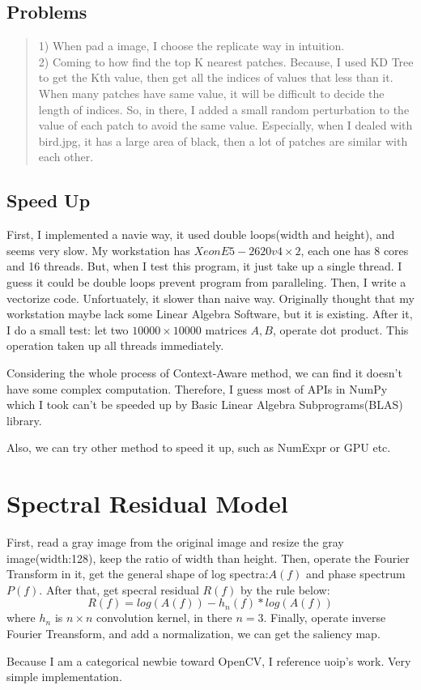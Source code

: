 \documentclass[10pt,twocolumn,letterpaper]{article}
\begin{document}
\subsection{Problems}
\begin{quote}
1) When pad a image, I choose the replicate way in intuition.\\
2) Coming to how find the top K nearest patches. Because, I used KD Tree to get the Kth value, then get all the indices of values that less than it. When many patches have same value, it will be difficult to decide the length of indices.
So, in there, I added a small random perturbation to the value of each patch to avoid the same value. Especially, when I dealed with bird.jpg, it has a large area of black, then a lot of patches are similar with each other.
\end{quote}
\subsection{Speed Up}
First, I implemented a navie way, it used double loops(width and height), and seems very slow. My workstation has $Xeon E5-2620 v4\times 2$, each one has 8 cores and 16 threads. But, when I test this program, it just take up a single thread. I guess it could be double loops prevent program from paralleling. Then, I write a vectorize code. Unfortuately, it slower than naive way. Originally thought that my workstation maybe lack some Linear Algebra Software, but it is existing. After it, I do a small test: let two $10000\times 10000$ matrices $A,B$, operate dot product. This operation taken up all threads immediately.
\par Considering the whole process of Context-Aware method, we can find it doesn't have some complex computation. Therefore, I guess most of APIs in NumPy which I took can't be speeded up by Basic Linear Algebra Subprograms(BLAS) library.
\par Also, we can try other method to speed it up, such as NumExpr or GPU etc.



\section{Spectral Residual Model}
First, read a gray image from the original image and resize the gray image(width:128), keep the ratio of width than height. Then, operate the Fourier Transform in it, get the general shape of log spectra:$A(f)$ and phase spectrum $P(f)$. After that, get specral residual $R(f)$ by the rule below:
\begin{equation}
R(f) = log(A(f)) - h_n(f)*log(A(f))
\end{equation}
where $h_n$ is $n\times n$ convolution kernel, in there $n=3$.
Finally, operate inverse Fourier Treansform, and add a normalization, we can get the saliency map.
\par Because I am a categorical newbie toward OpenCV, I reference uoip's work. Very simple implementation.
\end{document}
